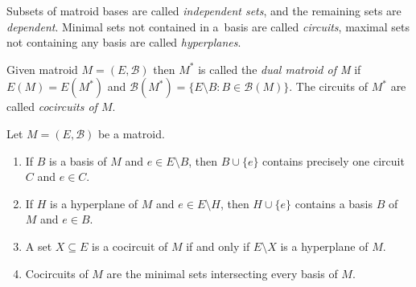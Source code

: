 Subsets of matroid bases are called \textit{independent sets}, and the remaining sets are \textit{dependent}. Minimal sets not contained in a~basis are called \textit{circuits}, maximal sets not containing any basis are called \textit{hyperplanes}.

\begin{defn}
Given matroid $M = (E,\mathcal{B})$ then $M^*$ is called the \textit{dual matroid of M} if $E(M) = E(M^*)$ and $\mathcal{B}(M^*) = \{E \setminus B : B \in \mathcal{B}(M) \}$. The circuits of $M^*$ are called \textit{cocircuits of $M$}.
\end{defn}

\pagebreak

\begin{claim}[folklore]
	\label{matroid_folklore}
	Let $M = (E, \mathcal{B})$ be a matroid.

	\begin{enumerate}[label=\alph*.]
		\item If $B$ is a basis of $M$ and $e \in E \setminus B$, then $B \cup \{e\}$ contains precisely one circuit $C$ and $e \in C$.
		\item If $H$ is a hyperplane of $M$ and $e \in E \setminus H$, then $H \cup \{e\}$ contains a basis $B$ of $M$ and $e \in B$.
		\item A set $X \subseteq E$ is a cocircuit of $M$ if and only if $E \setminus X$ is a hyperplane of $M$.
		\item Cocircuits of $M$ are the minimal sets intersecting every basis of $M$.
	\end{enumerate}
\end{claim}
